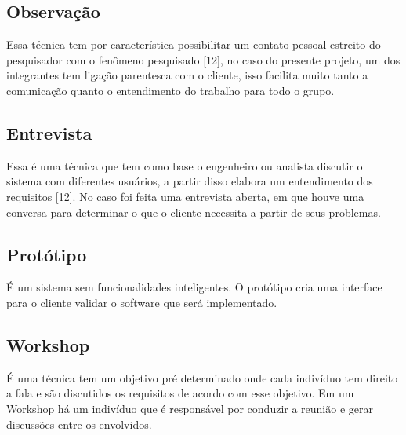 \subsection{Observação}
\tab Essa técnica tem por característica possibilitar um contato pessoal estreito do pesquisador com o fenômeno pesquisado [12], no caso do presente projeto, um dos integrantes tem ligação parentesca com o cliente, isso facilita muito tanto a comunicação quanto o entendimento do trabalho para todo o grupo.\\

\subsection{Entrevista}
\tab Essa é uma técnica que tem como base o engenheiro ou analista discutir o sistema com diferentes usuários, a partir disso elabora um entendimento dos requisitos [12]. No caso foi feita uma entrevista aberta, em que houve uma conversa para determinar o que o cliente necessita a partir de seus problemas.\\

\subsection{Protótipo}
\tab É um sistema sem funcionalidades inteligentes. O protótipo cria uma interface para o cliente validar o software que será implementado.\\

\subsection{Workshop}
\tab É uma técnica tem um objetivo pré determinado onde cada indivíduo tem direito a fala e são discutidos os requisitos de acordo com esse objetivo. Em um Workshop há um indivíduo que é responsável por conduzir a reunião e gerar discussões entre os envolvidos.\\

